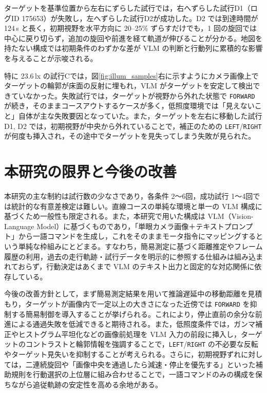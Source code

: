 \documentclass[a4paper,11pt]{ltjsreport}
\begin{document}
ターゲットを基準位置から左右にずらした試行では，右へずらした試行D1（ログID 175653）が失敗し，左へずらした試行D2が成功した。D2 では到達時間が 124\,s と長く，初期視野を水平方向に 20--25\% ずらすだけでも，1 回の旋回では中心に戻り切らず，追加の旋回や前進を経て軌道が伸びることが分かる。地図を持たない構成では初期条件のわずかな差が VLM の判断と行動列に累積的な影響を与えることが示唆される。

特に 23.6\,lx の試行Cでは，図\ref{fig:illum_samples}右に示すようにカメラ画像上でターゲットの輪郭が床面の反射に埋もれ，VLM がターゲットを安定して検出できていなかった。失敗試行では，ターゲットが視野から外れた状態で \texttt{FORWARD} が続き，そのままコースアウトするケースが多く，低照度環境では「見えないこと」自体が主な失敗要因となっていた。また，ターゲットを左右に移動した試行D1, D2 では，初期視野が中央から外れていることで，補正のための \texttt{LEFT}/\texttt{RIGHT} が何度も挿入され，その途中でターゲットを見失ってしまう失敗が見られた。

\section{本研究の限界と今後の改善}
本研究の主な制約は試行数の少なさであり，各条件 2〜6回，成功試行 1〜4回では統計的な有意差検定は難しい。直線コースの単純な環境と単一の VLM 構成に基づくため一般性も限定される。また，本研究で用いた構成は VLM（Vision-Language Model）に基づくものであり，「単眼カメラ画像＋テキストプロンプト」から一語コマンドを生成し，これをそのままモータ指令にマッピングするという単純な枠組みにとどまる。すなわち，簡易測定に基づく距離推定やフレーム履歴の利用，過去の走行軌跡・試行データを明示的に参照する仕組みは組み込まれておらず，行動決定はあくまで VLM のテキスト出力と固定的な対応関係に依存している。

今後の改善方針として，まず簡易測定結果を用いて推論遅延中の移動距離を見積もり，ターゲットが画像内で一定以上の大きさになった近傍では \texttt{FORWARD} を抑制する簡易制御を導入することが挙げられる。これにより，停止直前の余分な前進による通過失敗を低減できると期待される。また，低照度条件では，ガンマ補正やヒストグラム平坦化などの画像前処理を VLM 入力の前段に挿入し，ターゲットのコントラストと輪郭情報を強調することで，\texttt{LEFT}/\texttt{RIGHT} の不必要な反転やターゲット見失いを抑制することが考えられる。さらに，初期視野ずれに対しては，二連続旋回や「画像中央を通過したら減速・停止を優先する」といった補助規則を行動選択の上位層に組み合わせることで，一語コマンドのみの構成を保ちながら追従軌跡の安定性を高める余地がある。
\end{document}
